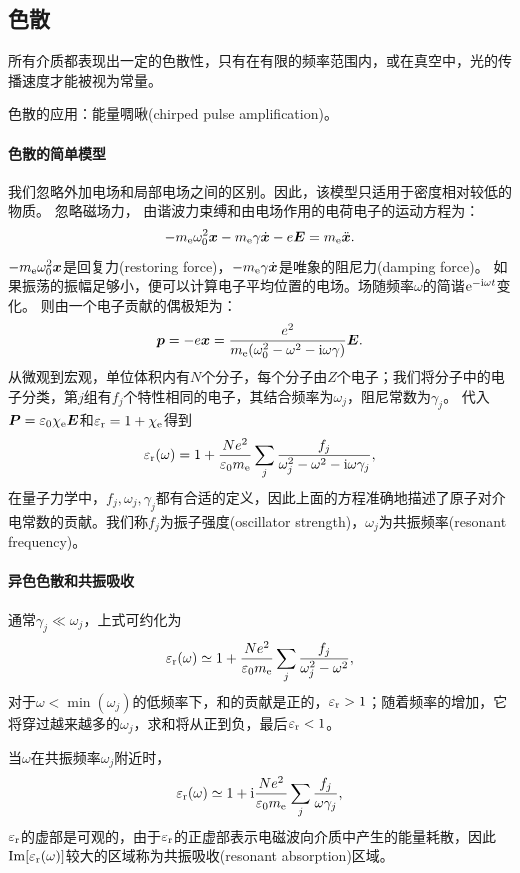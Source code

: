 \subsection{色散}
所有介质都表现出一定的色散性，只有在有限的频率范围内，或在真空中，光的传播速度才能被视为常量。

色散的应用：能量啁啾(chirped pulse amplification)。
\paragraph{色散的简单模型}
我们忽略外加电场和局部电场之间的区别。因此，该模型只适用于密度相对较低的物质。
忽略磁场力，
由谐波力束缚和由电场作用的电荷电子的运动方程为：
\[
    -m_\mathrm e\omega_0^2\bm x-m_\mathrm e\gamma\dot{\bm x}-e\bm E=m_\mathrm e\ddot{\bm x}.
\]
$-m_\mathrm e\omega_0^2\bm x$是回复力(restoring force)，$-m_\mathrm e\gamma\dot{\bm x}$是唯象的阻尼力(damping force)。
如果振荡的振幅足够小，便可以计算电子平均位置的电场。场随频率$\omega$的简谐$\mathop{}\!\mathrm{e}^{-\mathrm{i}\omega t}$变化。
则由一个电子贡献的偶极矩为：
\[
    \bm p=-e\bm x=\frac{e^2}{m_\mathrm e(\omega_0^2-\omega^2-\mathrm{i}\omega\gamma)}\bm E.
\]
从微观到宏观，单位体积内有$N$个分子，每个分子由$Z$个电子；我们将分子中的电子分类，第$j$组有$f_j$个特性相同的电子，其结合频率为$\omega_j$，阻尼常数为$\gamma_j$。
代入$\bm P=\varepsilon_0\chi_\mathrm e\bm E$和$\varepsilon_\text r=1+\chi_\mathrm e$得到
\begin{equation}
    \varepsilon_\text r(\omega)=1+\frac{Ne^2}{\varepsilon_0m_\mathrm e}\sum_j\frac{f_j}{\omega_j^2-\omega^2-\mathrm{i}\omega\gamma_j},
\end{equation}
在量子力学中，$f_j,\omega_j,\gamma_j$都有合适的定义，因此上面的方程准确地描述了原子对介电常数的贡献。我们称$f_j$为振子强度(oscillator strength)，$\omega_j$为共振频率(resonant frequency)。
\paragraph{异色色散和共振吸收}
通常$\gamma_j\ll\omega_j$，上式可约化为
\[
    \varepsilon_\text r(\omega)\simeq 1+\frac{Ne^2}{\varepsilon_0m_\mathrm e}\sum_j\frac{f_j}{\omega_j^2-\omega^2},
\]
对于$\omega<\min(\omega_j)$的低频率下，和的贡献是正的，$\varepsilon_\text r>1$；随着频率的增加，它将穿过越来越多的$\omega_j$，求和将从正到负，最后$\varepsilon_\text r<1$。

当$\omega$在共振频率$\omega_j$附近时，
\[
    \varepsilon_\text r(\omega)\simeq 1+\mathrm{i}\frac{Ne^2}{\varepsilon_0m_\mathrm e}\sum_j\frac{f_j}{\omega\gamma_j},
\]
$\varepsilon_\text r$的虚部是可观的，由于$\varepsilon_\text r$的正虚部表示电磁波向介质中产生的能量耗散，因此$\operatorname{Im}[\varepsilon_\text r(\omega)]$较大的区域称为共振吸收(resonant absorption)区域。

